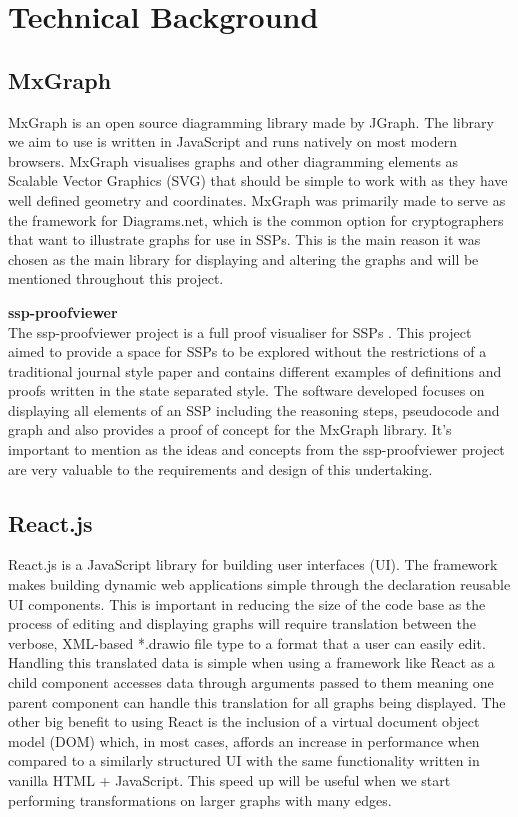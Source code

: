 \documentclass[bsc,frontabs,singlespacing,parskip,deptreport]{infthesis}
\newcommand{\chapsubhead}[1]{\vspace{0.5em}\textbf{\large #1 \vspace{0.5em}}}
\begin{document}
\section{Technical Background}

\subsection{MxGraph}
MxGraph\cite{mxgraph} is an open source diagramming library made by JGraph. The library we aim to use is written in JavaScript and runs natively on most modern browsers. MxGraph visualises graphs and other diagramming elements as Scalable Vector Graphics (SVG) that should be simple to work with as they have well defined geometry and coordinates. MxGraph was primarily made to serve as the framework for Diagrams.net, which is the common option for cryptographers that want to illustrate graphs for use in SSPs. This is the main reason it was chosen as the main library for displaying and altering the graphs and will be mentioned throughout this project.      

\chapsubhead{ssp-proofviewer}\\
The ssp-proofviewer project is a full proof visualiser for SSPs \cite{Puniamurthy2021}. This project aimed to provide a space for SSPs to be explored without the restrictions of a traditional journal style paper and contains different examples of definitions and proofs written in the state separated style. The software developed focuses on displaying all elements of an SSP including the reasoning steps, pseudocode and graph and also provides a proof of concept for the MxGraph library. It's important to mention as the ideas and concepts from the ssp-proofviewer project are very valuable to the requirements and design of this undertaking.    

\subsection{React.js}
React.js is a JavaScript library for building user interfaces (UI). The framework makes building dynamic web applications simple through the declaration reusable UI components. This is important in reducing the size of the code base as the process of editing and displaying graphs will require translation between the verbose, XML-based *.drawio file type to a format that a user can easily edit. Handling this translated data is simple when using a framework like React as a child component accesses data through arguments passed to them meaning one parent component can handle this translation for all graphs being displayed. The other big benefit to using React is the inclusion of a virtual document object model (DOM) which, in most cases, affords an increase in performance when compared to a similarly structured UI with the same functionality written in vanilla HTML + JavaScript. This speed up will be useful when we start performing transformations on larger graphs with many edges.     
\end{document}
